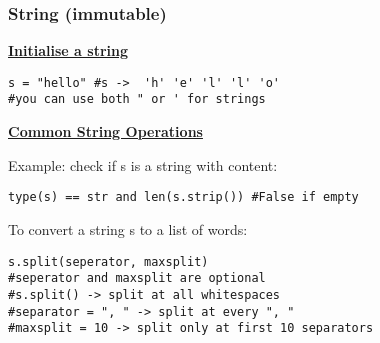 \subsubsection{String (immutable)}
{\centering\underline{\textbf{Initialise a string}} \par}
\begin{lstlisting}
s = "hello" #s ->  'h' 'e' 'l' 'l' 'o'
#you can use both " or ' for strings 
\end{lstlisting}

{\centering\underline{\textbf{Common String Operations}} \par}

Example: check if s is a string with content:
\begin{lstlisting}
type(s) == str and len(s.strip()) #False if empty
\end{lstlisting}
To convert a string s to a list of words:
\begin{lstlisting}
s.split(seperator, maxsplit) 
#seperator and maxsplit are optional
#s.split() -> split at all whitespaces
#separator = ", " -> split at every ", "
#maxsplit = 10 -> split only at first 10 separators
\end{lstlisting}